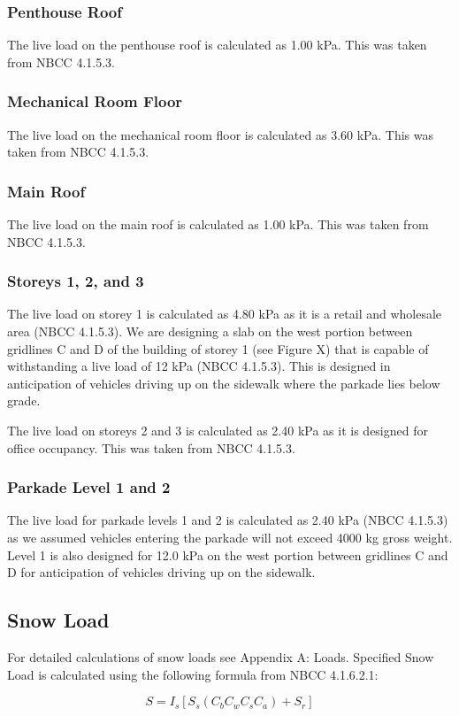 \documentclass[12pt]{article}
\begin{document}
\subsubsection{Penthouse Roof}
The live load on the penthouse roof is calculated as 1.00 kPa.
This was taken from NBCC 4.1.5.3.
\subsubsection{Mechanical Room Floor}
The live load on the mechanical room floor is calculated as 3.60 kPa.
This was taken from NBCC 4.1.5.3.
\subsubsection{Main Roof}
The live load on the main roof is calculated as 1.00 kPa.
This was taken from NBCC 4.1.5.3.
\subsubsection{Storeys 1, 2, and 3}
The live load on storey 1 is calculated as 4.80 kPa as it is a retail and wholesale area (NBCC 4.1.5.3).
We are designing a slab on the west portion between gridlines C and D of the building of storey 1 (see Figure X) that is capable of withstanding a live load of 12 kPa (NBCC 4.1.5.3). This is designed in anticipation of vehicles driving up on the sidewalk where the parkade lies below grade.

The live load on storeys 2 and 3 is calculated as 2.40 kPa as it is designed for office occupancy. This was taken from NBCC 4.1.5.3.
\subsubsection{Parkade Level 1 and 2}
The live load for parkade levels 1 and 2 is calculated as 2.40 kPa (NBCC 4.1.5.3)  as we assumed vehicles entering the parkade will not exceed 4000 kg gross weight.
Level 1 is also designed for 12.0 kPa on the west portion between gridlines C and D for anticipation of vehicles driving up on the sidewalk.
\subsection{Snow Load}
For detailed calculations of snow loads see Appendix A: Loads.
Specified Snow Load is calculated using the following formula from NBCC 4.1.6.2.1:

\begin{equation*}
    S = I_{s}[S_{s}(C_{b}C_{w}C_{s}C_{a})+S_{r}]
\end{equation*}
\end{document}
